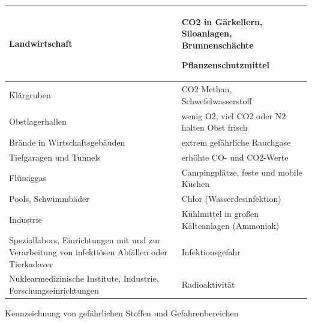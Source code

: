 \documentclass{article}
\begin{document}
\begin{flushleft}
\tablehead{}\begin{supertabular}{|m{6.393cm}m{6.9030004cm}|}
\hline
Landwirtschaft

 &
CO2 in G\"arkellern, Siloanlagen, Brunnensch\"achte

Pflanzenschutzmittel

\\\hline
Kl\"argruben

 &
CO2 Methan, Schwefelwasserstoff

\\\hline
Obstlagerhallen

 &
wenig O2, viel CO2 oder N2 halten Obst frisch

\\\hline
Br\"ande in Wirtschaftsgeb\"auden

 &
extrem gef\"ahrliche Rauchgase

\\\hline
Tiefgaragen und Tunnels

 &
erh\"ohte CO- und CO2-Werte

\\\hline
Fl\"ussiggas

 &
Campingpl\"atze, feste und mobile K\"uchen

\\\hline
Pools, Schwimmb\"ader

 &
Chlor (Wasserdesinfektion)

\\\hline
Industrie

 &
K\"uhlmittel in gro{\ss}en K\"alteanlagen (Ammoniak)

\\\hline
Speziallabors, Einrichtungen mit und zur Verarbeitung von infekti\"osen
Abf\"allen oder Tierkadaver

 &
Infektionsgefahr

\\\hline
Nuklearmedizinische Institute, Industrie, Forschungseinrichtungen

 &
Radioaktivit\"at

\\\hline
\end{supertabular}
\end{flushleft}
Kennzeichnung von gef\"ahrlichen Stoffen und Gefahrenbereichen
\end{document}
